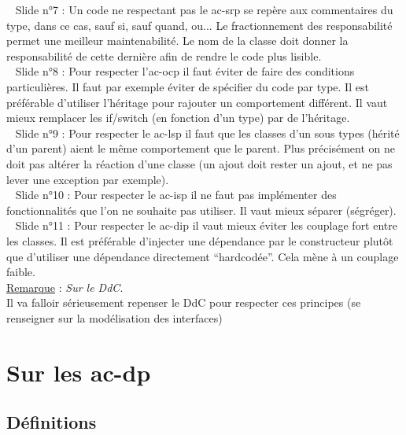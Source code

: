 \documentclass[a4paper,12pt,twoside]{article}
\newcommand{\incode}[1]{{\footnotesize\ttfamily #1}} %
\newcommand{\rem}[2]{\noindent\underline{Remarque} : \textit{#1}.\\ \indent #2}
\newcommand{\slide}[2]{\textbullet ~ Slide n°#1 : \indent #2}
\begin{document}
\slide{7}{Un code ne respectant pas le \gls{ac-srp} se repère aux commentaires du type, dans ce cas, sauf si, sauf quand, ou... Le fractionnement des responsabilité permet une meilleur maintenabilité. Le nom de la classe doit donner la responsabilité de cette dernière afin de rendre le code plus lisible.
}\\ 

\slide{8}{Pour respecter l'\gls{ac-ocp} il faut éviter de faire des conditions particulières. Il faut par exemple éviter de spécifier du code par type. Il est préférable d'utiliser l'héritage pour rajouter un comportement différent. Il vaut mieux remplacer les \incode{if}/\incode{switch} (en fonction d'un type) par de l'héritage.
}\\ 

\slide{9}{Pour respecter le \gls{ac-lsp} il faut que les classes d'un sous types (hérité d'un parent) aient le même comportement que le parent. Plus précisément on ne doit pas altérer la réaction d'une classe (un ajout doit rester un ajout, et ne pas lever une exception par exemple).
}\\

\slide{10}{Pour respecter le \gls{ac-isp} il ne faut pas implémenter des fonctionnalités que l'on ne souhaite pas utiliser. Il vaut mieux séparer (ségréger).
}\\

\slide{11}{Pour respecter le \gls{ac-dip} il vaut mieux éviter les couplage fort entre les classes. Il est préférable d'injecter une dépendance par le constructeur plutôt que d'utiliser une dépendance directement ``hardcodée''. Cela mène à un couplage faible. 
} \\

\rem{Sur le DdC}{Il va falloir sérieusement repenser le DdC pour respecter ces principes (se renseigner sur la modélisation des interfaces)}

\section{Sur les \gls{ac-dp}}

\subsection{Définitions}
\end{document}
